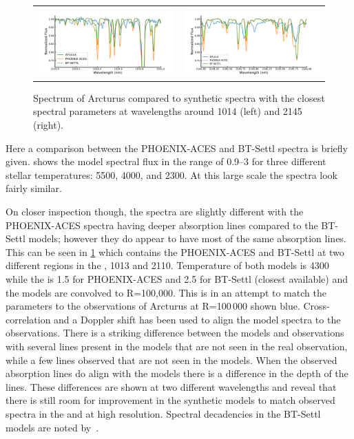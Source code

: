\begin{figure}
    \centering
    \begin{tabular}{cc}
        \includegraphics[width=0.48\linewidth]{figures/atmos_and_models/artucus_1micron} & \includegraphics[width=0.48\linewidth]{figures/atmos_and_models/artucus_2micron}\\
    \end{tabular}
    \caption[Comparision of the spectrum of Arcturus to synthetic specta.]{Spectrum of Arcturus compared to synthetic spectra with the closest spectral parameters at wavelengths around 1014\nm{} (left) and 2145\nm{} (right).}
    \label{fig:artucus1-2micron}
\end{figure}

Here a comparison between the {PHOENIX-ACES} and {BT-Settl} spectra is briefly given.
 shows the model spectral flux in the \nir{} range of 0.9--3\um{} for three different stellar temperatures: 5500, 4000, and 2300\K{}.
At this large scale the spectra look fairly similar.

On closer inspection though, the spectra are slightly different with the {PHOENIX-ACES} spectra having deeper absorption lines compared to the {BT-Settl} models; however they do appear to have most of the same absorption lines.
This can be seen in \cref{fig:artucus1-2micron} which contains the {PHOENIX-ACES} and {BT-Settl} at two different regions in the \nir, 1013\nm{} and 2110\nm{}.
Temperature of both models is 4300\K{} while the \logg{} is 1.5 for {PHOENIX-ACES} and 2.5 for {BT-Settl} (closest available) and the models are convolved to R=100,000.
This is in an attempt to match the parameters to the observations of {Arcturus} at R=100\,000 shown blue.
Cross-correlation and a Doppler shift has been used to align the model spectra to the observations.
There is a striking difference between the models and observations with several lines present in the models that are not seen in the real observation, while a few lines observed that are not seen in the models.
When the observed absorption lines do align with the models there is a difference in the depth of the lines.
These differences are shown at two different wavelengths and reveal that there is still room for improvement in the synthetic models to match observed spectra in the \nir{} and at high resolution.
Spectral decadencies in the {BT-Settl} models are noted by~\citet{rajpurohit_effective_2013}.

